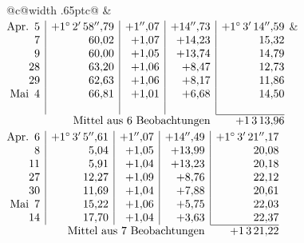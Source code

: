\noindent\begin{tabular}{@{}c@{\hspace{.4em}\vrule width .65pt\hspace{.4em}}c@{}}
 &
 \\[.18ex]
\(\begin{array}[t]{@{}r|r|r|r|r@{}}
\text{Apr.}\enspace 5 & +1^\circ\,2'\,58''{,}79 & +1''{,}07 & +14''{,}73 & +1^\circ\,3'\,14''{,}59\\
7 & 60{,}02 & +1{,}07 & +14{,}23 & 15{,}32\\
9 & 60{,}00 & +1{,}05 & +13{,}74 & 14{,}79\\
28 & 63{,}20 & +1{,}06 & +8{,}47 & 12{,}73\\
29 & 62{,}63 & +1{,}06 & +8{,}17 & 11{,}86\\
\text{Mai}\enspace 4 & 66{,}81 & +1{,}01 & +6{,}68 & 14{,}50\\
 & & & & \\
\cline{5-5}
\multicolumn{4}{r}{\text{Mittel aus 6 Beobachtungen}} & +1\,3\,13{,}96
\end{array}\)
&
\(\begin{array}[t]{@{}r|r|r|r|r@{}}
\text{Apr.}\enspace 6 & +1^\circ\,3'\,5''{,}61 & +1''{,}07 & +14''{,}49 & +1^\circ\,3'\,21''{,}17\\
8 & 5{,}04 & +1{,}05 & +13{,}99 & 20{,}08\\
11 & 5{,}91 & +1{,}04 & +13{,}23 & 20{,}18\\
27 & 12{,}27 & +1{,}09 & +8{,}76 & 22{,}12\\
30 & 11{,}69 & +1{,}04 & +7{,}88 & 20{,}61\\
\text{Mai}\enspace 7 & 15{,}22 & +1{,}06 & +5{,}75 & 22{,}03\\
14 & 17{,}70 & +1{,}04 & +3{,}63 & 22{,}37\\
\cline{5-5}
\multicolumn{4}{r}{\text{Mittel aus 7 Beobachtungen}} & +1\,3\,21{,}22
\end{array}\)
\end{tabular}\par\medskip

\par\clearpage
\noindent\makebox[12mm][l]{}\par\medskip

